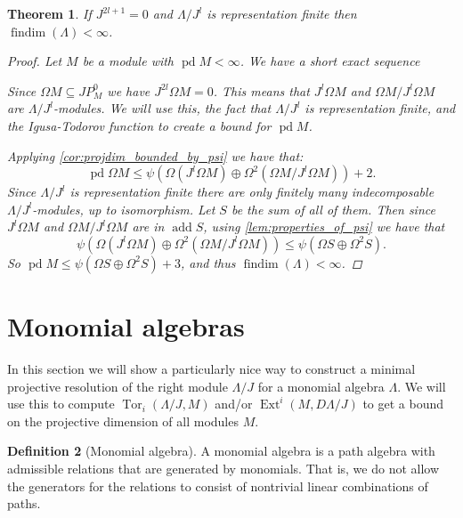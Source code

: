 \documentclass[11pt, a4paper, english]{article}
\newtheorem{theorem}{Theorem}[section]
\theoremstyle{definition}
\newtheorem{defn}[theorem]{Definition}
\DeclareMathOperator{\Ext}{Ext}
\DeclareMathOperator{\Tor}{Tor}
\DeclareMathOperator{\findim}{findim}
\DeclareMathOperator{\pd}{pd}
\DeclareMathOperator{\add}{add}
\begin{document}
\begin{theorem}\cite{Wang94}
	If $J^{2l+1} = 0$ and $\Lambda / J^l$ is representation finite then $\findim(\Lambda) < \infty$.
	\begin{proof}
		Let $M$ be a module with $\pd M < \infty$. We have a short exact sequence 
		\begin{center}
		\end{center}
		Since $\Omega M \subseteq JP^0_M$ we have $J^{2l}\Omega M = 0$. This means that $J^l\Omega M$ and $\Omega M / J^l\Omega M$ are $\Lambda / J^l$-modules. We will use this, the fact that $\Lambda / J^l$ is representation finite, and the Igusa-Todorov function to create a bound for $\pd M$.
		
		Applying \cref{cor:projdim_bounded_by_psi} we have that:
		$$ \pd \Omega M \leq \psi(\Omega (J^l\Omega M)\oplus\Omega^2(\Omega M / J^l\Omega M)) + 2.$$ 
		Since $\Lambda / J^l$ is representation finite there are only finitely many indecomposable $\Lambda / J^l$-modules, up to isomorphism. Let $S$ be the sum of all of them. Then since $J^l\Omega M$ and $\Omega M / J^l\Omega M$ are in $\add S$, using \cref{lem:properties_of_psi} we have that 
		$$\psi(\Omega (J^l\Omega M)\oplus\Omega^2(\Omega M / J^l\Omega M)) \leq \psi(\Omega S \oplus \Omega^2 S).$$
		So $\pd M \leq \psi(\Omega S \oplus \Omega^2 S) + 3$, and thus $\findim(\Lambda) < \infty$.
	\end{proof}
\end{theorem}

\section{Monomial algebras}\label{sec:monomial_algebras}
\cite{GKK91, IgZa90}

In this section we will show a particularly nice way to construct a minimal projective resolution of the right module $\Lambda / J$ for a monomial algebra $\Lambda$. We will use this to compute $\Tor_i(\Lambda /J, M)$ and/or $\Ext^i(M, D\Lambda/J)$ to get a bound on the projective dimension of all modules $M$.

\begin{defn}[Monomial algebra]
	A monomial algebra is a path algebra with admissible relations that are generated by monomials. That is, we do not allow the generators for the relations to consist of nontrivial linear combinations of paths.
\end{defn}
\end{document}
